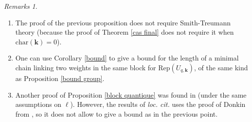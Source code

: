 \documentclass[11pt]{amsart}
\theoremstyle{plain}
\theoremstyle{remark}
\newtheorem{rems}[thm]{Remarks}
\numberwithin{equation}{section}
\begin{document}
\begin{rems}\begin{enumerate}
    \item The proof of the previous proposition does not require Smith-Treumann theory (because the proof of Theorem \ref{cas final} does not require it when $\mathrm{char}(\mathbf{k})=0$).
    \item One can use Corollary \ref{bound} to give a bound for the length of a minimal chain linking two weights in the same block for $\mathrm{Rep}(U_{q,\mathbf{k}})$, of the same kind as Proposition \ref{bound group}. 
    \item Another proof of Proposition \ref{block quantique} was found in \cite{thams1994blocks} (under the same assumptions on $\ell$). However, the results of \textit{loc. cit.} uses the proof of Donkin from \cite{donkin1980blocks}, so it does not allow to give a bound as in the previous point.
\end{enumerate}

\end{rems}

	
	
	
	
	
	
	
\end{document}
